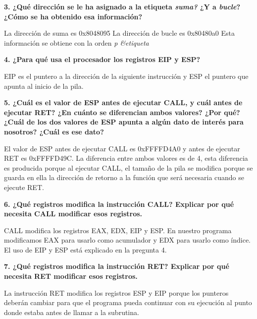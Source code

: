 \documentclass{article}
\begin{document}
  \begin{flushleft}
    \textbf{3. ¿Qué dirección se le ha asignado a la etiqueta \textit{suma?}
    ¿Y a \textit{bucle}? ¿Cómo se ha obtenido esa información?} \break

    La dirección de suma es 0x8048095 \break
    La dirección de bucle es 0x80480a0 \break
    Esta información se obtiene con la orden \textit{p \&etiqueta}
  \end{flushleft}

  \begin{flushleft}
    \textbf{4. ¿Para qué usa el procesador los registros EIP y ESP?} \break

    EIP es el puntero a la dirección de la siguiente instrucción y ESP el puntero que
    apunta al inicio de la pila.
  \end{flushleft}

  \begin{flushleft}
    \textbf{5. ¿Cuál es el valor de ESP antes de ejecutar CALL, y cuál antes de ejecutar RET?
    ¿En cuánto se diferencian ambos valores? ¿Por qué? ¿Cuál de los dos valores de
    ESP apunta a algún dato de interés para nosotros? ¿Cuál es ese dato?} \break

    El valor de ESP antes de ejecutar CALL es 0xFFFFD4A0 y antes de ejecutar RET es 0xFFFFD49C.
    La diferencia entre ambos valores es de 4, esta diferencia es producida porque al ejecutar CALL,
    el tamaño de la pila se modifica porque se guarda en ella la dirección de retorno a la función que
    será necesaria cuando se ejecute RET.
  \end{flushleft}

  \begin{flushleft}
    \textbf{6. ¿Qué registros modifica la instrucción CALL? Explicar por qué necesita
    CALL modificar esos registros.} \break

    CALL modifica los registros EAX, EDX, EIP y ESP. \break
    En nuestro programa modificamos EAX para usarlo como acumulador y EDX para usarlo
    como índice. El uso de EIP y ESP está explicado en la pregunta 4.
  \end{flushleft}

  \begin{flushleft}
    \textbf{7. ¿Qué registros modifica la instrucción RET? Explicar por qué
    necesita RET modificar esos registros.} \break

    La instrucción RET modifica los registros ESP y EIP porque los punteros deberán
    cambiar para que el programa pueda continuar con su ejecución al punto donde
    estaba antes de llamar a la subrutina.
  \end{flushleft}
\end{document}
